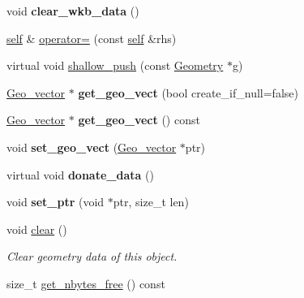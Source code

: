 \begin{DoxyCompactItemize}
\item 
\mbox{\label{classGis__wkb__vector_a93c40f113c9932bd04349e8629b6eacb}} 
void {\bfseries clear\+\_\+wkb\+\_\+data} ()
\item 
\mbox{\hyperlink{classGis__wkb__vector}{self}} \& \mbox{\hyperlink{classGis__wkb__vector_a9e183f3cd3142637dd6edfe7682184b7}{operator=}} (const \mbox{\hyperlink{classGis__wkb__vector}{self}} \&rhs)
\item 
virtual void \mbox{\hyperlink{classGis__wkb__vector_a32edb92094841a33b5613cffe467cdcf}{shallow\+\_\+push}} (const \mbox{\hyperlink{classGeometry}{Geometry}} $\ast$g)
\item 
\mbox{\label{classGis__wkb__vector_a88c4c0d534d3921bff93a9a7ea461954}} 
\mbox{\hyperlink{classGeometry__vector}{Geo\+\_\+vector}} $\ast$ {\bfseries get\+\_\+geo\+\_\+vect} (bool create\+\_\+if\+\_\+null=false)
\item 
\mbox{\label{classGis__wkb__vector_a3d5b825255d23d6b53db9646aad6b9cb}} 
\mbox{\hyperlink{classGeometry__vector}{Geo\+\_\+vector}} $\ast$ {\bfseries get\+\_\+geo\+\_\+vect} () const
\item 
\mbox{\label{classGis__wkb__vector_a276f5a0f77ae2d92e7cd8f272e3653f5}} 
void {\bfseries set\+\_\+geo\+\_\+vect} (\mbox{\hyperlink{classGeometry__vector}{Geo\+\_\+vector}} $\ast$ptr)
\item 
\mbox{\label{classGis__wkb__vector_aed1ac21ec1a0a348741bb36ac1b1e991}} 
virtual void {\bfseries donate\+\_\+data} ()
\item 
\mbox{\label{classGis__wkb__vector_ad922c2faae97e9d106c6a3f1aa34980e}} 
void {\bfseries set\+\_\+ptr} (void $\ast$ptr, size\+\_\+t len)
\item 
void \mbox{\hyperlink{classGis__wkb__vector_a99d744483968b46dc086d156dff6be2f}{clear}} ()
\begin{DoxyCompactList}\small\item\em Clear geometry data of this object. \end{DoxyCompactList}\item 
size\+\_\+t \mbox{\hyperlink{classGis__wkb__vector_a71d71fe9cbec2ea04c9b08f9278a490a}{get\+\_\+nbytes\+\_\+free}} () const

\end{DoxyCompactItemize}
